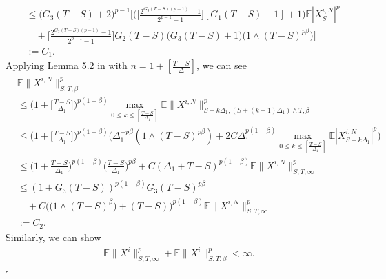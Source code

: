 \documentclass[12pt]{article}
\def\E{\mathbb E}
\newenvironment{proof}{{\noindent\it Proof.}\ }{\hfill $\square$\par}
\numberwithin{equation}{section}
\begin{document}
\begin{proof}
\begin{equation}
\begin{aligned}
				&\leq \big(G_3(T-S)+2 \big)^{p-1}
				\Big[\Big(\Big[\frac{2^{G_3(T-S)(p-1)}-1}{2^{p-1}-1}\Big][G_1(T-S)-1]+1\big)\E|X^{i,N}_S|^p\\
				&\quad+\Big[\frac{2^{G_3(T-S)(p-1)}-1}{2^{p-1}-1}\Big]G_2(T-S)\Big(G_3(T-S)+1\Big)\Big(1\wedge (T-S)^{p\beta}\Big)\Big]\\
				&:=C_1.
			\end{aligned}
		\end{equation}
		Applying Lemma 5.2 in \cite{fan} with $n =1+[\frac{T-S}{\Delta}]$, we can see
		\begin{equation}\label{eq-3.29}
			\begin{aligned}
				&\E\|X^{i,N}\|^p_{S,T,\beta}\\
				&\leq \Big(1+\big[\frac{T-S}{\Delta_1}\big]\Big)^{p(1-\beta)}\max_{0\leq k \leq [\frac{T-S}{\Delta_1}]}\E\|X^{i,N}\|^p_{S+k\Delta_1,(S+(k+1)\Delta_1)\wedge T,\beta}\\
				&\leq \Big(1+\big[\frac{T-S}{\Delta_1}\big]\Big)^{p(1-\beta)}\Big(\Delta_1^{-p\beta}(1\wedge (T-S)^{p\beta})+2C\Delta_1^{p(1-\beta)}\max_{0\leq k \leq [\frac{T-S}{\Delta_1}]}\E|X^{i,N}_{S+k\Delta_1}|^p\Big)\\
				&\leq \Big(1+\frac{T-S}{\Delta_1}\Big)^{p(1-\beta)}\Big(\frac{T-S}{\Delta_1}\Big)^{p\beta}+C(\Delta_1+T-S)^{p(1-\beta)}\E\|X^{i,N}\|^p_{S,T,\infty}\\
				&\leq (1+G_3(T-S))^{p(1-\beta)}G_3(T-S)^{p\beta}\\
				&\quad+C\Big(\big(1\wedge (T-S)^{\beta}\big)+(T-S)\Big)^{p(1-\beta)}\E\|X^{i,N}\|^p_{S,T,\infty}\\
				&:=C_2.
			\end{aligned}
		\end{equation}
		Similarly, we can show
		\begin{align*}
			\E\|X^i\|^p_{S,T,\infty}+\E\|X^i\|^p_{S,T,\beta}< \infty.
		\end{align*}
	\end{proof}
	
\end{document}
